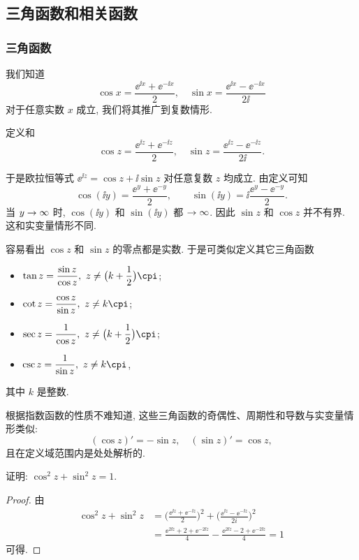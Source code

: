 \subsection{三角函数和相关函数}

\subsubsection{三角函数}

我们知道
  \[
    \cos x=\frac{\ee^{\ii x}+\ee^{-\ii x}}2,\quad
    \sin x=\frac{\ee^{\ii x}-\ee^{-\ii x}}{2\ii}
  \]
对于任意实数 $x$ 成立,
我们将其推广到复数情形.

\begin{definition}
  定义和
  \[
    \cos z=\frac{\ee^{\ii z}+\ee^{-\ii z}}2,\quad
    \sin z=\frac{\ee^{\ii z}-\ee^{-\ii z}}{2\ii}.
  \]
\end{definition}

于是欧拉恒等式 \alert{$\ee^{\ii z}=\cos z+\ii\sin z$ 对任意复数 $z$ 均成立}.
由定义可知
\[
  \cos(\ii y)=\frac{\ee^y+\ee^{-y}}2,\qquad
  \sin(\ii y)=\ii\frac{\ee^y-\ee^{-y}}2.
\]
当 $y\rightarrow\infty$ 时, $\cos(\ii y)$ 和 $\sin(\ii y)$ 都 $\rightarrow\infty$.
因此 \alert{$\sin z$ 和 $\cos z$ 并不有界}. 
这和实变量情形不同.

容易看出 $\cos z$ 和 $\sin z$ 的零点都是实数.
于是可类似定义其它三角函数
\begin{itemize}
  \item {} $\tan z=\dfrac{\sin z}{\cos z},\ z\neq\bigl(k+\dfrac12\bigr)\cpi$;
  \item {} $\cot z=\dfrac{\cos z}{\sin z},\ z\neq k\cpi$;
  \item {} $\sec z=\dfrac{1}{\cos z},\ z\neq\bigl(k+\dfrac12\bigr)\cpi$;
  \item {} $\csc z=\dfrac{1}{\sin z},\ z\neq k\cpi$,
\end{itemize}
其中 $k$ 是整数.

根据指数函数的性质不难知道, 这些三角函数的奇偶性、周期性和导数与实变量情形类似:
  \[
    (\cos z)'=-\sin z,\quad
    (\sin z)'=\cos z,
  \]
且在定义域范围内是处处解析的.

\begin{example}
  证明: $\cos^2z+\sin^2z=1$.
\end{example}
\begin{proof}
  由
  \begin{align*}
    \cos^2z+\sin^2z&
    =\biggl(\frac{\ee^{\ii z}+\ee^{-\ii z}}2\biggr)^2
      +\biggl(\frac{\ee^{\ii z}-\ee^{-\ii z}}{2i}\biggr)^2\\&
    =\frac{\ee^{2\ii z}+2+\ee^{-2\ii z}}4-\frac{\ee^{2\ii z}-2+\ee^{-2\ii z}}4
    =1
  \end{align*}
  可得.
\end{proof}

